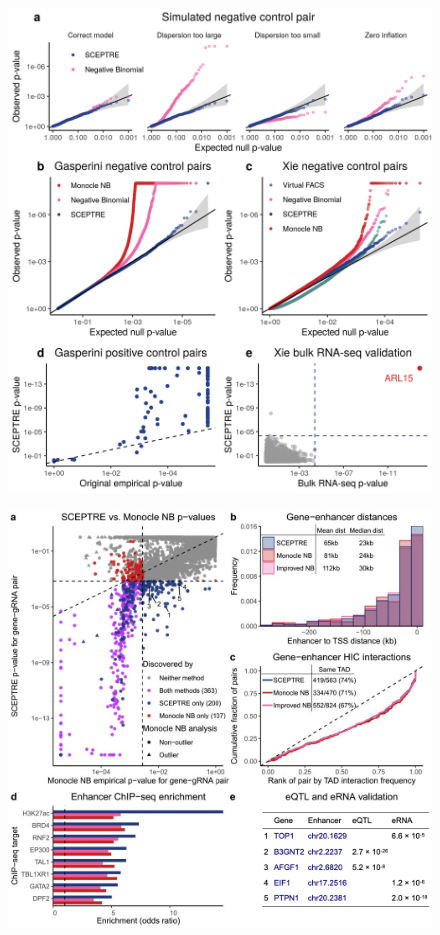 \documentclass{article}
\begin{document}
\clearpage
\begin{figure}[h]
	\includegraphics[width = \textwidth]{Figure3.png}
	\label{fig:ground_truth}
	\caption{}
\end{figure}
\clearpage
\begin{figure}[h]
	\includegraphics[width = \textwidth]{Figure4.png}
	\caption{}
	\label{fig:application}
\end{figure}
\end{document}
